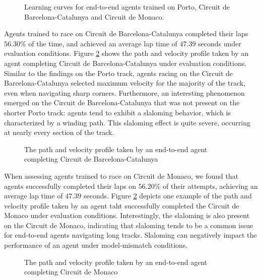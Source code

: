 \begin{figure}[htb!]
    \centering
    
    \caption[Learning curves for end-to-end agents trained and tested on Porto, Circuit de Barcelona-Catalunya and Circuit de Monaco]{Learning curves for end-to-end agents trained on Porto, Circuit de Barcelona-Catalunya and Circuit de Monaco.}
    \label{fig:ete_reward}
\end{figure}


Agents trained to race on Circuit de Barcelona-Catalunya completed their laps $56.30\%$ of the time, and achieved an average lap time of $47.39$ seconds under evaluation conditions.
Figure \ref{fig:ete_esp} shows the path and velocity profile taken by an agent completing Circuit de Barcelona-Catalunya under evaluation conditions.
Similar to the findings on the Porto track, agents racing on the Circuit de Barcelona-Catalunya selected maximum velocity for the majority of the track, even when navigating sharp corners. 
Furthermore, an interesting phenomenon emerged on the Circuit de Barcelona-Catalunya that was not present on the shorter Porto track: agents tend to exhibit a slaloming behavior, which is characterized by a winding path. 
This slaloming effect is quite severe, occurring at nearly every section of the track.


\begin{figure}[htb!]
    \centering
    
    \caption[The path and velocity profile taken by an end-to-end agent completing Circuit de Barcelona-Catalunya]{The path and velocity profile taken by an end-to-end agent completing Circuit de Barcelona-Catalunya}
    \label{fig:ete_esp}
\end{figure}

When assessing agents trained to race on Circuit de Monaco, we found that agents successfully completed their laps on $56.20\%$ of their attempts, achieving an average lap time of $47.39$ seconds. 
Figure \ref{fig:ete_esp} depicts one example of the path and velocity profile taken by an agent taht successfully completed the Circuit de Monaco under evaluation conditions. 
Interestingly, the slaloming is also present on the Circuit de Monaco, indicating that slaloming tends to be a common issue for end-to-end agents navigating long tracks.
Slaloming can negatively impact the performance of an agent under model-mismatch conditions.

\begin{figure}[htb!]
    \centering
    
    \caption[The path and velocity profile taken by an end-to-end agent completing Circuit de Monaco]{The path and velocity profile taken by an end-to-end agent completing Circuit de Monaco}
    \label{fig:ete_mco}
\end{figure}





